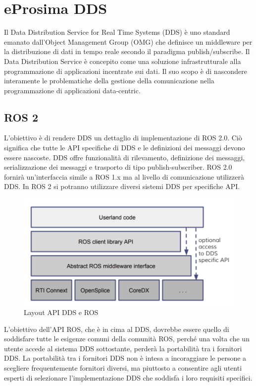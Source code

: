 \documentclass[a4paper]{article}
\begin{document}
\newpage
\section{eProsima DDS}

Il Data Distribution Service for Real Time Systems (DDS) è uno standard emanato dall'Object Management Group (OMG) che definisce un middleware per la distribuzione di dati in tempo reale secondo il paradigma publish/subscribe.
Il Data Distribution Service è concepito come una soluzione infrastrutturale alla programmazione di applicazioni incentrate sui dati. Il suo scopo è di nascondere interamente le problematiche della gestione della comunicazione nella programmazione di applicazioni data-centric.

\subsection{ROS 2}
L'obiettivo è di rendere DDS un dettaglio di implementazione di ROS 2.0. Ciò significa che tutte le API specifiche di DDS e le definizioni dei messaggi devono essere nascoste. DDS offre funzionalità di rilevamento, definizione dei messaggi, serializzazione dei messaggi e trasporto di tipo publish-subscriber.
ROS 2.0 fornirà un'interfaccia simile a ROS 1.x ma al livello di comunicazione utilizzerà DDS. In ROS 2 si potranno utilizzare diversi sistemi DDS per specifiche API.

\begin{figure}[htbp]
\centering
\includegraphics[scale=0.5]{dds_img.PNG} 
\caption{Layout API DDS e ROS}
\end{figure}

L'obiettivo dell'API ROS, che è in cima al DDS, dovrebbe essere quello di soddisfare tutte le esigenze comuni della comunità ROS, perché una volta che un utente accede al sistema DDS sottostante, perderà la portabilità tra i fornitori DDS. La portabilità tra i fornitori DDS non è intesa a incoraggiare le persone a scegliere frequentemente fornitori diversi, ma piuttosto a consentire agli utenti esperti di selezionare l'implementazione DDS che soddisfa i loro requisiti specifici. 
\end{document}
